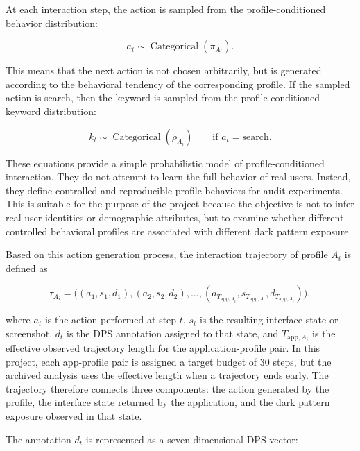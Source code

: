 At each interaction step, the action is sampled from the profile-conditioned behavior distribution:

\begin{equation}
a_t \sim \operatorname{Categorical}(\pi_{A_i}).
\label{eq:action-sampling}
\end{equation}

This means that the next action is not chosen arbitrarily, but is generated according to the behavioral tendency of the corresponding profile. If the sampled action is search, then the keyword is sampled from the profile-conditioned keyword distribution:

\begin{equation}
k_t \sim \operatorname{Categorical}(\rho_{A_i})
\qquad
\text{if } a_t = \mathrm{search}.
\label{eq:keyword-sampling}
\end{equation}

These equations provide a simple probabilistic model of profile-conditioned interaction. They do not attempt to learn the full behavior of real users. Instead, they define controlled and reproducible profile behaviors for audit experiments. This is suitable for the purpose of the project because the objective is not to infer real user identities or demographic attributes, but to examine whether different controlled behavioral profiles are associated with different dark pattern exposure.

Based on this action generation process, the interaction trajectory of profile $A_i$ is defined as

\begin{equation}
\tau_{A_i}
=
\big(
(a_1, s_1, d_1),
(a_2, s_2, d_2),
\ldots,
(a_{T_{\mathrm{app},A_i}}, s_{T_{\mathrm{app},A_i}}, d_{T_{\mathrm{app},A_i}})
\big),
\label{eq:trajectory}
\end{equation}

where $a_t$ is the action performed at step $t$, $s_t$ is the resulting interface state or screenshot, $d_t$ is the DPS annotation assigned to that state, and \(T_{\mathrm{app},A_i}\) is the effective observed trajectory length for the application-profile pair. In this project, each app-profile pair is assigned a target budget of 30 steps, but the archived analysis uses the effective length when a trajectory ends early. The trajectory therefore connects three components: the action generated by the profile, the interface state returned by the application, and the dark pattern exposure observed in that state.

The annotation $d_t$ is represented as a seven-dimensional DPS vector:

